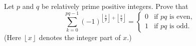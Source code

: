 \documentclass{article}
\begin{document}
\setlength{\parindent}{0pt}
Let \( p \) and \( q \) be relatively prime positive integers. Prove that
\[
\sum_{k=0}^{pq-1} (-1)^{\left\lfloor \frac{k}{p} \right\rfloor + \left\lfloor \frac{k}{q} \right\rfloor} =
\begin{cases}
0 & \text{if } pq \text{ is even}, \\
1 & \text{if } pq \text{ is odd}.
\end{cases}
\]
(Here \( \left\lfloor x \right\rfloor \) denotes the integer part of \( x \).)

\end{document}

